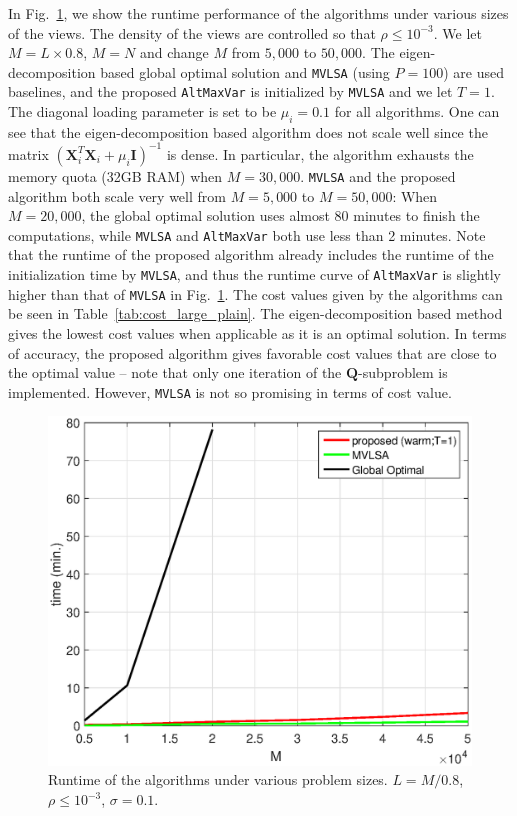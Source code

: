 \documentclass[10pt,journal]{IEEEtran}
\begin{document}
In Fig.~\ref{fig:runtime_plain}, we show the runtime performance of the algorithms under various sizes of the views.
The density of the views are controlled so that $\rho \leq 10^{-3}$.
We let $M=L\times 0.8$, $M=N$ and change $M$ from $5,000$ to $50,000$.
The eigen-decomposition based global optimal solution and \texttt{MVLSA} (using $P=100$) are used
baselines, and the proposed \texttt{AltMaxVar} is initialized by \texttt{MVLSA} and we let $T=1$.
The diagonal loading parameter is set to be $\mu_i=0.1$ for all algorithms.
One can see that the eigen-decomposition based algorithm does not scale well since the matrix $({\bm X}_i^T{\bm X}_i+\mu_i{\bm I})^{-1}$ is dense.
In particular, the algorithm exhausts the memory quota (32GB RAM) when $M=30,000$. 
\texttt{MVLSA} and the proposed algorithm both scale very well from $M=5,000$ to $M=50,000$:
When $M=20,000$, the global optimal solution uses almost 80 minutes to finish the computations,
while \texttt{MVLSA} and \texttt{AltMaxVar} both use less than 2 minutes.
Note that the runtime of the proposed algorithm already includes the runtime of the initialization time by \texttt{MVLSA}, and thus the runtime curve of \texttt{AltMaxVar} is slightly higher than that of \texttt{MVLSA} in Fig.~\ref{fig:runtime_plain}.
The cost values given by the algorithms can be seen in Table~\ref{tab:cost_large_plain}.
The eigen-decomposition based method gives the lowest cost values when applicable as it is an optimal solution.
In terms of accuracy, the proposed algorithm gives favorable cost values that are close to the optimal value -- note that only one iteration of the ${\bm Q}$-subproblem is implemented.
However, \texttt{MVLSA} is not so promising in terms of cost value.


\begin{figure}[ht]
\centering
{\includegraphics[width=.75\linewidth]{runtime.eps}
\caption{Runtime of the algorithms under various problem sizes. $L=M/0.8$, $\rho\leq 10^{-3}$, $\sigma=0.1$.}
\label{fig:runtime_plain}}
\end{figure}
\end{document}
